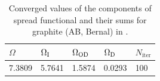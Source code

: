 \begin{table}[h!]
	\centering
	\captionsetup{width=.5\textwidth}
	\caption{Converged values of the components of spread functional and their sums for graphite (AB, Bernal) in \angsqd{}.}
	\begin{tabular}{@{} lllll @{}}\toprule[1.5pt]
	$\Omega$ & $\Omega\tinysub{I}$ & $\Omega\tinysub{OD}$ & $\Omega\tinysub{D}$ & $N_{\mathrm{iter}}$ \\\midrule
	7.3809 & 5.7641 & 1.5874 & 0.0293 & 100 \\\bottomrule[1pt]
	\end{tabular}\label{tab10.1}
\end{table} 
